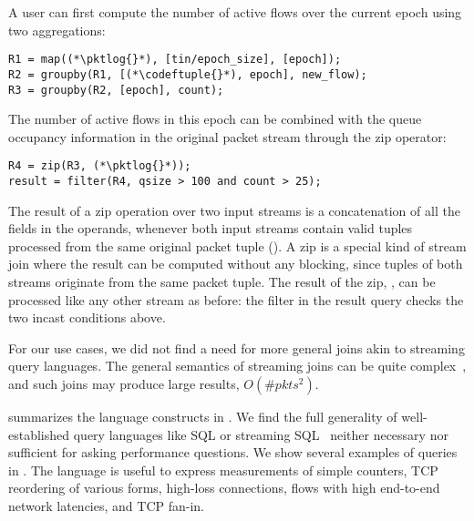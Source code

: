 

A user can first compute the number of active flows over the current epoch using
two aggregations:
\begin{lstlisting}
R1 = map((*\pktlog{}*), [tin/epoch_size], [epoch]);
R2 = groupby(R1, [(*\codeftuple{}*), epoch], new_flow);
R3 = groupby(R2, [epoch], count);
\end{lstlisting}
The number of active flows in this epoch can be combined with the queue
occupancy information in the original packet stream through the {\ct zip}
operator:
\begin{lstlisting}
R4 = zip(R3, (*\pktlog{}*));
result = filter(R4, qsize > 100 and count > 25);
\end{lstlisting}
The result of a {\ct zip} operation over two input streams is a concatenation of
all the fields in the operands, whenever both input streams contain valid tuples
processed from the same original packet tuple (). A {\ct zip} is a special kind of
stream join where the result can be computed without any blocking, since tuples
of both streams originate from the same packet tuple. The result of the {\ct
  zip}, , can be processed like any other stream as before: the {\ct
  filter} in the {\ct result} query checks the two incast conditions above.

For our use cases, we did not find a need for more general joins akin to
streaming query languages. The general semantics of streaming joins can be quite
complex~\cite{cql-vldb}, and such joins may produce large results, \ie
$O(\#pkts^2)$.

 summarizes the language constructs in
\TheSystem. We find the full generality of well-established query languages like
SQL or streaming SQL~\cite{aurora, sparksql} neither necessary nor sufficient
for asking performance questions. We show several examples of \TheSystem queries
in . The language is useful to express measurements of
simple counters, TCP reordering of various forms, high-loss connections, flows
with high end-to-end network latencies, and TCP fan-in.

